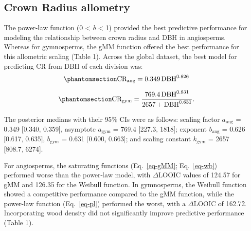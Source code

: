 \documentclass[
  12pt,
  letterpaper,
  DIV=11,
  numbers=noendperiod]{scrartcl}
\providecommand{\DIFadd}[1]{{\protect\color{blue}\uwave{#1}}} %
\providecommand{\DIFdel}[1]{{\protect\color{red}\sout{#1}}}                      %
\providecommand{\DIFaddbegin}{} %
\providecommand{\DIFaddend}{} %
\providecommand{\DIFdelbegin}{} %
\providecommand{\DIFdelend}{} %
\newcommand{\DIFscaledelfig}{0.5}
\newlength{\DIFdelgraphicswidth} %
\newlength{\DIFdelgraphicsheight} %
\newcommand{\DIFaddincludegraphics}[2][]{{\color{blue}\fbox{\DIFOincludegraphics[#1]{#2}}}} %
\newcommand{\DIFdelincludegraphics}[2][]{%
\sbox{\DIFdelgraphicsbox}{\DIFOincludegraphics[#1]{#2}}%
\settoboxwidth{\DIFdelgraphicswidth}{\DIFdelgraphicsbox} %
\settoboxtotalheight{\DIFdelgraphicsheight}{\DIFdelgraphicsbox} %
\scalebox{\DIFscaledelfig}{%
\parbox[b]{\DIFdelgraphicswidth}{\usebox{\DIFdelgraphicsbox}\\[-\baselineskip] \rule{\DIFdelgraphicswidth}{0em}}\llap{\resizebox{\DIFdelgraphicswidth}{\DIFdelgraphicsheight}{%
\setlength{\unitlength}{\DIFdelgraphicswidth}%
\begin{picture}(1,1)%
\thicklines\linethickness{2pt} %
{\color[rgb]{1,0,0}\put(0,0){\framebox(1,1){}}}%
{\color[rgb]{1,0,0}\put(0,0){\line( 1,1){1}}}%
{\color[rgb]{1,0,0}\put(0,1){\line(1,-1){1}}}%
\end{picture}%
}\hspace*{3pt}}} %
} %
\DeclareRobustCommand{\DIFaddbegin}{\DIFOaddbegin \let\includegraphics\DIFaddincludegraphics} %
\DeclareRobustCommand{\DIFaddend}{\DIFOaddend \let\includegraphics\DIFOincludegraphics} %
\DeclareRobustCommand{\DIFdelbegin}{\DIFOdelbegin \let\includegraphics\DIFdelincludegraphics} %
\DeclareRobustCommand{\DIFdelend}{\DIFOaddend \let\includegraphics\DIFOincludegraphics} %
\begin{document}
\subsection{Crown Radius allometry}\label{crown-radius-allometry}

The power-law function (0 \textless{} \emph{b} \textless{} 1) provided
the best predictive performance for modeling the relationship between
crown radius and DBH in angiosperms. Whereas for gymnosperms, the gMM
function offered the best performance for this allometric scaling (Table
1). Across the global dataset, the best model for predicting CR from DBH
of each \DIFdelbegin \DIFdel{division }\DIFdelend \DIFaddbegin \DIFadd{clade }\DIFaddend was: \begin{equation}\phantomsection\label{eq-cr_ang}{
\mathrm{CR_{ang}} = \mathrm{0.349}
\, \mathrm{DBH}^{\mathrm{0.626}}
}\end{equation}

\begin{equation}\phantomsection\label{eq-cr_gym}{
\mathrm{CR_{gym}} = \frac{\mathrm{769.4}
\, \mathrm{DBH}^{\mathrm{0.631}}}{\mathrm{2657}
+ \mathrm{DBH}^{\mathrm{0.631}}}.
}\end{equation}

The posterior medians with their 95\% CIs were as follows: scaling
factor \(a_{\text{ang}}\) = 0.349 {[}0.340, 0.359{]}, asymptote
\(a_{\text{gym}}\) = 769.4 {[}227.3, 1818{]}; exponent
\(b_{\text{ang}}\) = 0.626 {[}0.617, 0.635{]}, \(b_{\text{gym}}\) =
0.631 {[}0.600, 0.663{]}; and scaling constant \(k_{\text{gym}}\) = 2657
{[}808.7, 6274{]}.

For angiosperms, the saturating functions (Eq.~\ref{eq-gMM};
Eq.~\ref{eq-wb}) performed worse than the power-law model, with
\(\Delta\)LOOIC values of 124.57 for gMM and 126.35 for the Weibull
function. In gymnosperms, the Weibull function showed a competitive
performance compared to the gMM function, while the power-law function
(Eq.~\ref{eq-pl}) performed the worst, with a \(\Delta\)LOOIC of 162.72.
Incorporating wood density did not significantly improve predictive
performance (Table 1).
\end{document}
